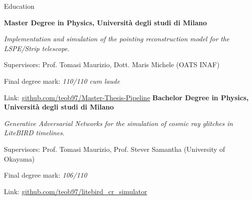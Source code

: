 \begin{rubric}{Education}

\entry*[04/2023]%
	\textbf{Master Degree in Physics, Università degli studi di Milano}
	\par \emph{Implementation and simulation of the pointing reconstruction model for the LSPE/Strip telescope}.
    \par Supervisors: Prof. Tomasi Maurizio, Dott. Maris Michele (OATS INAF)
    \par Final degree mark: \emph{110/110 cum laude}
    \par Link: \href{https://github.com/teob97/Master-Thesis-Pipeline}{github.com/teob97/Master-Thesis-Pipeline}
%
\entry*[12/2020]%
	\textbf{Bachelor Degree in Physics, Università degli studi di Milano}
    \par \emph{Generative Adversarial Networks for the simulation of cosmic ray glitches in LiteBIRD timelines}.
    \par Supervisors: Prof. Tomasi Maurizio, Prof. Stever Samantha (University of Okayama)
    \par Final degree mark: \emph{106/110}
    \par Link: \href{https://github.com/teob97/litebird_cr_simulator}{github.com/teob97/litebird\_cr\_simulator}
\end{rubric}
